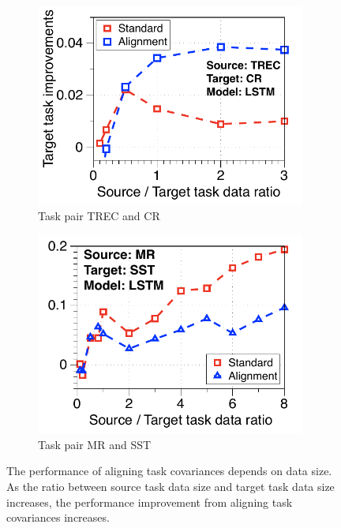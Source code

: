 \begin{figure}[!h]
	\centering
	\begin{subfigure}[b]{0.33\textwidth}
		\centering
		\includegraphics[width=0.975\textwidth]{figures/ratio_alignment_norm_trec_cr_lstm.pdf}
		\caption{Task pair TREC and CR}
	\end{subfigure}\hfill
		\begin{subfigure}[b]{0.33\textwidth}
		\centering
		\includegraphics[width=0.975\textwidth]{figures/ratio_alignment_mr_sst_lstm.pdf}
		\caption{Task pair MR and SST}
	\end{subfigure}
	\caption{The performance of aligning task covariances depends on data size. As the ratio between source task data size and target task data size increases, the performance improvement from aligning task covariances increases.}
	\label{fig_covariate_app}
\end{figure}

